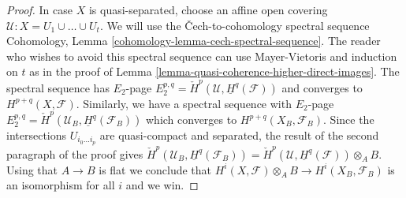 \begin{proof}
\medskip\noindent
In case $X$ is quasi-separated, choose an affine open covering
$\mathcal{U} : X = U_1 \cup \ldots \cup U_t$. We will use the
{\v C}ech-to-cohomology spectral sequence
Cohomology, Lemma \ref{cohomology-lemma-cech-spectral-sequence}.
The reader who wishes to avoid this spectral sequence
can use Mayer-Vietoris and induction on $t$ as in the proof of
Lemma \ref{lemma-quasi-coherence-higher-direct-images}.
The spectral sequence has $E_2$-page
$E_2^{p, q} = \check{H}^p(\mathcal{U}, \underline{H}^q(\mathcal{F}))$
and converges to $H^{p + q}(X, \mathcal{F})$.
Similarly, we have a spectral sequence with $E_2$-page
$E_2^{p, q} = \check{H}^p(\mathcal{U}_B, \underline{H}^q(\mathcal{F}_B))$
which converges to $H^{p + q}(X_B, \mathcal{F}_B)$.
Since the intersections $U_{i_0 \ldots i_p}$ are quasi-compact
and separated, the result of the second paragraph of the proof gives
$\check{H}^p(\mathcal{U}_B, \underline{H}^q(\mathcal{F}_B)) =
\check{H}^p(\mathcal{U}, \underline{H}^q(\mathcal{F})) \otimes_A B$.
Using that $A \to B$ is flat we conclude that
$H^i(X, \mathcal{F}) \otimes_A B \to H^i(X_B, \mathcal{F}_B)$
is an isomorphism for all $i$ and we win.
\end{proof}